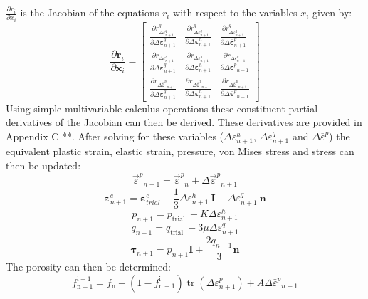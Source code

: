 \documentclass[sn-mathphys,Numbered,draft]{sn-jnl}%
\begin{document}
$\frac{\partial r_i}{\partial x_i}$ is the Jacobian of the equations $r_i$ with respect to the variables $x_i$ given by:
\begin{equation}
\frac{\partial \boldsymbol{r}_i}{\partial \boldsymbol{x}_i}=\left[\begin{array}{ccc}
\frac{\partial r_{\Delta \varepsilon_{n+1}^q}^q}{\partial \Delta \boldsymbol{\varepsilon}_{n+1}^q} & \frac{\partial r_{\Delta \varepsilon_{n+1}^q}^q}{\partial \Delta \boldsymbol{\varepsilon}_{n+1}^h} & \frac{\partial r_{\Delta \varepsilon_{n+1}^q}^q}{\partial \Delta \overline{\boldsymbol{\varepsilon}}^p_{n+1}} \\
\frac{\partial r_{\Delta \varepsilon_{n+1}^h}}{\partial \Delta \boldsymbol{\varepsilon}_{n+1}^q} & \frac{\partial r_{\Delta \varepsilon_{n+1}^h}}{\partial \Delta \boldsymbol{\varepsilon}_{n+1}^h} & \frac{\partial r_{\Delta \varepsilon_{n+1}^h}}{\partial \Delta \overline{\boldsymbol{\varepsilon}}^p{ }_{n+1}} \\
\frac{\partial r_{\Delta \overline{\boldsymbol{\varepsilon}}^p{ }_{n+1}}}{\partial \Delta \boldsymbol{\varepsilon}_{n+1}^q} & \frac{\partial r_{\Delta \overline{\boldsymbol{\varepsilon}}^p{ }_{n+1}}}{\partial \Delta \boldsymbol{\varepsilon}_{n+1}^h} & \frac{\partial r_{\Delta \overline{\boldsymbol{\varepsilon}}^p{ }_{n+1}}}{\partial \Delta \overline{\boldsymbol{\varepsilon}}^p{ }_{n+1}}
\end{array}\right]
\end{equation}
Using simple multivariable calculus operations these constituent partial derivatives of the Jacobian can then be derived. These derivatives are provided in Appendix C **. 
After solving for these variables
($\Delta {\varepsilon}_{n+1}^h$, $\Delta {\varepsilon}_{n+1}^q$ and $\Delta \overline{{\varepsilon}}^p$) the equivalent plastic strain, elastic strain, pressure, von Mises stress and stress can then be updated:
\begin{equation}
\vec{\varepsilon}^p{ }_{n+1}=\vec{\varepsilon}^p{ }_n+\Delta \vec{\varepsilon}^p{ }_{n+1} 
\end{equation}
\begin{equation}
\boldsymbol{\varepsilon}^{e}_{n+1}=\boldsymbol{\varepsilon}^{e}_{trial}-\frac{1}{3}\Delta {\varepsilon}_{n+1}^h\ \mathbf{I}-\Delta {\varepsilon}_{n+1}^q\ \mathbf{n}
\end{equation}
\begin{equation}
p_{n+1}=p_{\text {trial }}-K \Delta \varepsilon_{n+1}^h 
\end{equation}
\begin{equation}
q_{n+1}=q_{\text {trial }}-3 \mu \Delta \varepsilon_{n+1}^q 
\end{equation}
\begin{equation}
\boldsymbol{\tau}_{n+1}=p_{n+1} \boldsymbol{I}+\frac{2q_{n+1}}{3} \boldsymbol{n} 
\end{equation}
The porosity can then be determined:
\begin{equation}
f_{\mathrm{n}+1}^{\mathrm{i}+1}=f_{\mathrm{n}}+\left(1-f_{\mathrm{n}+1}^{\mathrm{i}}\right) \operatorname{tr}\left(\Delta \varepsilon_{n+1}^p\right)+A \Delta \bar{\varepsilon}^p{ }_{n+1}
\end{equation}
\end{document}
